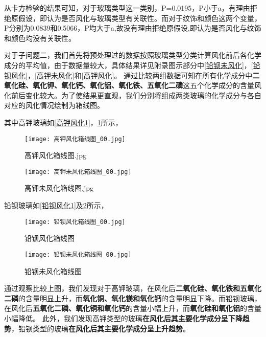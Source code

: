 \documentclass{MathModeling}
\begin{document}
	从卡方检验的结果可知，对于玻璃类型这一类别，P=0.0195，P小于a，有理由拒绝原假设，即认为是否风化与玻璃类型有关联性。而对于纹饰和颜色这两个变量，P分别为0.0839和0.5066，P均大于a,故没有理由拒绝原假设,即认为是否风化与纹饰和颜色均没有关联性。
	
	{\heiti 对于子问题二}，我们首先将预处理过的数据按照玻璃类型分类计算风化前后各化学成分的平均值，由于数据量较大，具体结果详见附录图示部分中\textcolor{blue}{\cref{铅钡未风化}}，\textcolor{blue}{\cref{铅钡风化}}，\textcolor{blue}{\cref{高钾未风化}}和\textcolor{blue}{\cref{高钾风化}}。
	通过比较两组数据可知在所有化学成分中{\textbf{二氧化硅、氧化钾、氧化钙、氧化铝、氧化铁、五氧化二磷}}这五个化学成分的含量风化前后变化较大。为了使结果更直观，我们分别将组成两类玻璃的化学成分与各自对应的风化情况绘制为箱线图。
	
	其中高钾玻璃如\textcolor{blue}{\cref{高钾风化1}}，\textcolor{blue}{\cref{高钾未风化1}}所示，
	\begin{figure}[htbp]
		\begin{minipage}[t]{0.5\textwidth}%
			\centering
			\texttt{[image: 高钾风化箱线图\_00.jpg]}
			\caption{高钾风化箱线图.jpg}%
			\label{高钾风化1}
			\end{minipage}
			\begin{minipage}[t]{0.5\textwidth}
			\centering
			\texttt{[image: 高钾未风化箱线图\_00.jpg]}
			\caption{高钾未风化箱线图.jpg}
			\label{高钾未风化1}
			\end{minipage}
			\end{figure}
	
		铅钡玻璃如\textcolor{blue}{\cref{铅钡风化1}}及\textcolor{blue}{\cref{铅钡未风化1}}所示，
	\begin{figure}[htbp]
		\begin{minipage}[t]{0.5\textwidth}%
			\centering
			\texttt{[image: 铅钡风化箱线图\_00.jpg]}
			\caption{铅钡风化箱线图}%
			\label{铅钡风化1}
			\end{minipage}
			\begin{minipage}[t]{0.5\textwidth}
			\centering
			\texttt{[image: 铅钡未风化箱线图\_00.jpg]}
			\caption{铅钡未风化箱线图}
			\label{铅钡未风化1}
			\end{minipage}
			\end{figure}
	
		通过观察比较上图，我们发现对于{\heiti 高钾玻璃}，在风化后{\textbf{二氧化硅、氧化铁和五氧化二磷}}的含量明显上升，而{\textbf{氧化铜、氧化镁和氧化钙}}的含量明显下降。而{\heiti 铅钡玻璃}，在风化后{\textbf{五氧化二磷、氧化铜和氧化钙}}的含量小幅上升，而{\textbf{氧化硅和氧化铝}}的含量小幅降低。
		此外，我们发现高钾类型的玻璃{\textbf{在风化后其主要化学成分呈下降趋势}}，铅钡类型的玻璃{\textbf{在风化后其主要化学成分呈上升趋势}}。
	
\end{document}
